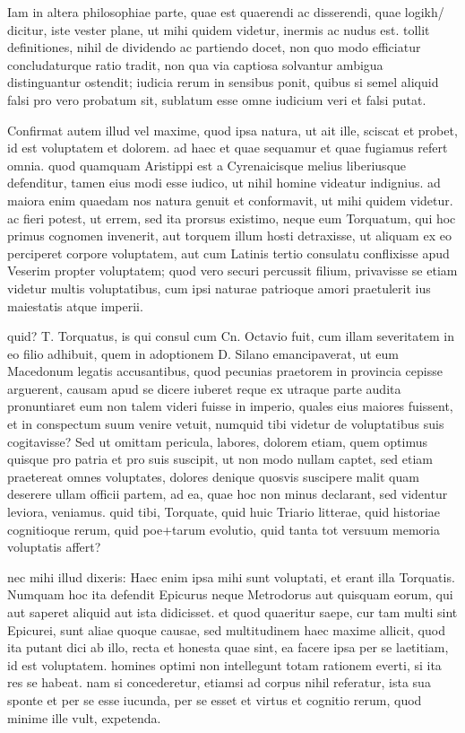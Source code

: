  Iam in altera philosophiae parte, quae est quaerendi ac disserendi, quae logikh/ dicitur, iste vester plane, ut mihi quidem videtur, inermis ac nudus est. tollit definitiones, nihil de dividendo ac partiendo docet, non quo modo efficiatur concludaturque ratio tradit, non qua via captiosa solvantur ambigua distinguantur ostendit; iudicia rerum in sensibus ponit, quibus si semel aliquid falsi pro vero probatum sit, sublatum esse omne iudicium veri et falsi putat.

 Confirmat autem illud vel maxime, quod ipsa natura, ut ait ille, sciscat et probet, id est voluptatem et dolorem. ad haec et quae sequamur et quae fugiamus refert omnia. quod quamquam Aristippi est a Cyrenaicisque melius liberiusque defenditur, tamen eius modi esse iudico, ut nihil homine videatur indignius. ad maiora enim quaedam nos natura genuit et conformavit, ut mihi quidem videtur. ac fieri potest, ut errem, sed ita prorsus existimo, neque eum Torquatum, qui hoc primus cognomen invenerit, aut torquem illum hosti detraxisse, ut aliquam ex eo perciperet corpore voluptatem, aut cum Latinis tertio consulatu conflixisse apud Veserim propter voluptatem; quod vero securi percussit filium, privavisse se etiam videtur multis voluptatibus, cum ipsi naturae patrioque amori praetulerit ius maiestatis atque imperii.

 quid? T. Torquatus, is qui consul cum Cn. Octavio fuit, cum illam severitatem in eo filio adhibuit, quem in adoptionem D. Silano emancipaverat, ut eum Macedonum legatis accusantibus, quod pecunias praetorem in provincia cepisse arguerent, causam apud se dicere iuberet reque ex utraque parte audita pronuntiaret eum non talem videri fuisse in imperio, quales eius maiores fuissent, et in conspectum suum venire vetuit, numquid tibi videtur de voluptatibus suis cogitavisse? Sed ut omittam pericula, labores, dolorem etiam, quem optimus quisque pro patria et pro suis suscipit, ut non modo nullam captet, sed etiam praetereat omnes voluptates, dolores denique quosvis suscipere malit quam deserere ullam officii partem, ad ea, quae hoc non minus declarant, sed videntur leviora, veniamus. quid tibi, Torquate, quid huic Triario litterae, quid historiae cognitioque rerum, quid poe+tarum evolutio, quid tanta tot versuum memoria voluptatis affert?

 nec mihi illud dixeris: Haec enim ipsa mihi sunt voluptati, et erant illa Torquatis. Numquam hoc ita defendit Epicurus neque Metrodorus aut quisquam eorum, qui aut saperet aliquid aut ista didicisset. et quod quaeritur saepe, cur tam multi sint Epicurei, sunt aliae quoque causae, sed multitudinem haec maxime allicit, quod ita putant dici ab illo, recta et honesta quae sint, ea facere ipsa per se laetitiam, id est voluptatem. homines optimi non intellegunt totam rationem everti, si ita res se habeat. nam si concederetur, etiamsi ad corpus nihil referatur, ista sua sponte et per se esse iucunda, per se esset et virtus et cognitio rerum, quod minime ille vult, expetenda.

